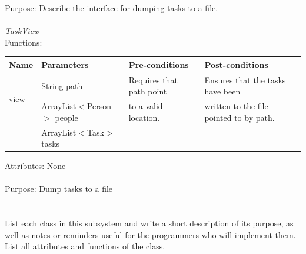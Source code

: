Purpose: Describe the interface for dumping tasks to a file.
\\
\\
\emph{TaskView}\\
Functions:\\
\begin{tabular}{| l | l | l | l |}
\hline
Name & Parameters & Pre-conditions & Post-conditions\\
\hline
\multirow{2}{*}{view} & String path                                 & Requires that path point & Ensures that the tasks have been\\ 
			 & ArrayList$<$Person$>$ people & to a valid location.          & written to the file pointed to by path.\\ 
                                     & ArrayList$<$Task$>$ tasks       &                             & 
\\
\hline
\end{tabular}

Attributes: None\\
\\
Purpose: Dump tasks to a file\\
\\
\\
List each class in this subsystem and write a short description of its purpose,
as well as notes or reminders useful for the programmers who will implement them.
List all attributes and functions of the class.